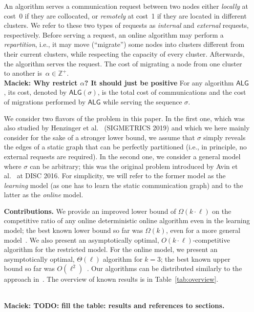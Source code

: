 \documentclass[manuscript,screen=true, review, anonymous]{acmart}
\newcommand{\ALG}{\textsf{ALG}\xspace}
\newcommand\maciek[1]{\color{brown}\textbf{\\ Maciek: #1}\color{black}}
\begin{document}
An algorithm serves a communication request between two nodes
either \emph{locally} at cost~0
if they are collocated,
or \emph{remotely} at cost~1
if they are located in different clusters.
We refer to these two types of requests as \emph{internal}
and \emph{external} requests, respectively.
Before serving a request,
an online algorithm may perform a \emph{repartition},
i.e.,
it may move (``migrate'') some nodes into clusters different from their current clusters, while respecting the capacity of every cluster. 
Afterwards, 
the algorithm serves the  request.
The cost of migrating a node from one cluster to another
is~$\alpha \in \mathbb{Z}^+$.
\maciek{Why restrict $\alpha$? It should just be positive}
For any algorithm $\ALG$,
its cost,
denoted by $\ALG(\sigma)$,
is the total cost of communications and
the cost of migrations performed by $\ALG$ while serving the sequence $\sigma$.

We consider two flavors of the problem
in this paper. In the first one, which
was also studied by Henzinger et al.~\cite{sigmetrics19_partitioning}
(SIGMETRICS 2019) and which
we here mainly consider for the sake of a stronger
lower bound, we assume that $\sigma$
simply reveals the edges of a static graph
that can be perfectly partitioned
(i.e., in principle, no external requests
are required). 
In the second one, we consider a general
model where $\sigma$ can be arbitrary;
this was the original problem introduced
by Avin et al.~\cite{repartition-disc} at DISC 2016.
For simplicity, we will refer to the former
model as the \emph{learning} model (as
one has to learn the static communication graph) 
and to the latter as the \emph{online} model.


\noindent \textbf{Contributions.}
We provide an improved lower bound 
of $\Omega(k\cdot\ell)$ on the competitive ratio of any online deterministic online algorithm 
even in the learning model;
the best known lower bound so far was $\Omega(k)$,
even for a more general model~\cite{repartition-disc}.
We also present an asymptotically optimal, 
$O(k\cdot \ell)$-competitive algorithm
for the restricted model.
For the online model, we present  
an asymptotically optimal,
$\Theta(\ell)$ algorithm for $k=3$;
the best known upper bound 
so far was $O(\ell^2)$~\cite{repartition-disc}.
%
Our algorithms can be distributed
similarly to the approach in~\cite{sigmetrics19_partitioning}.
The overview of known results is in Table~\ref{tab:overview}.

\maciek{TODO: fill the table: results and references to sections.}
\end{document}
